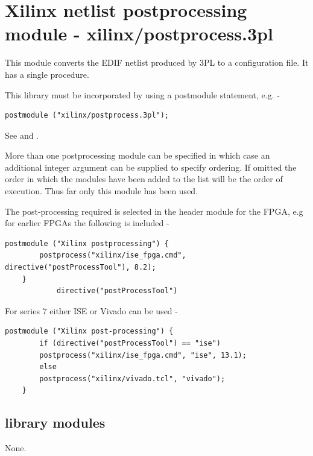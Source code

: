\pagebreak

\section{Xilinx netlist postprocessing module - xilinx/postprocess.3pl}\label{ch:pp}

    This module converts the EDIF netlist produced by 3PL to a configuration
    file. It has a single procedure.
    
    This library must be incorporated by using a postmodule statement, e.g. -
    \begin{lstlisting}[gobble=4, language=threepl]
       postmodule ("xilinx/postprocess.3pl");
    \end{lstlisting}
    
    See  and .
    
    More than one postprocessing module can be specified in which case an
    additional integer argument can be supplied to specify ordering. If
    omitted the order in which the modules have been added to the list will
    be the order of execution. Thus far only this module has been used.
    
    The post-processing required is selected in the header module for
    the FPGA, e.g for earlier FPGAs the following is included -

    \begin{lstlisting}[gobble=12, language=threepl]
    postmodule ("Xilinx postprocessing") {
        postprocess("xilinx/ise_fpga.cmd", directive("postProcessTool"), 8.2);
    }
            directive("postProcessTool")
    \end{lstlisting}

    For series 7 either ISE or Vivado can be used -
    
    \begin{lstlisting}[gobble=12, language=threepl]
    postmodule ("Xilinx post-processing") {
        if (directive("postProcessTool") == "ise")
	    postprocess("xilinx/ise_fpga.cmd", "ise", 13.1);
        else
	    postprocess("xilinx/vivado.tcl", "vivado");
    }
    \end{lstlisting}


    \subsection{library modules}

        None.



